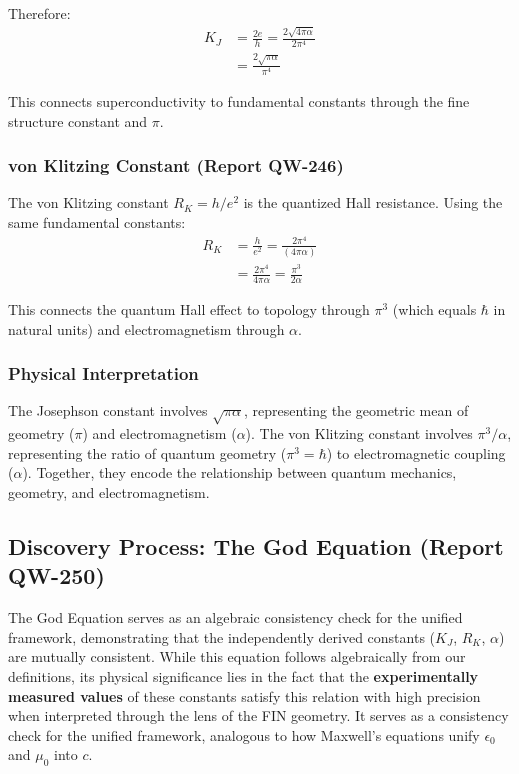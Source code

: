 \documentclass[11pt, a4paper]{article}
\begin{document}
Therefore:
\begin{align}
K_J &= \frac{2e}{h} = \frac{2\sqrt{4\pi\alpha}}{2\pi^4}\\
&= \frac{2\sqrt{\pi\alpha}}{\pi^4}
\label{eq:josephson}
\end{align}

This connects superconductivity to fundamental constants through the fine structure constant and $\pi$.

\subsubsection{von Klitzing Constant (Report QW-246)}

The von Klitzing constant $R_K = h/e^2$ is the quantized Hall resistance. Using the same fundamental constants:
\begin{align}
R_K &= \frac{h}{e^2} = \frac{2\pi^4}{(4\pi\alpha)}\\
&= \frac{2\pi^4}{4\pi\alpha} = \frac{\pi^3}{2\alpha}
\label{eq:klitzing}
\end{align}

This connects the quantum Hall effect to topology through $\pi^3$ (which equals $\hbar$ in natural units) and electromagnetism through $\alpha$.

\subsubsection{Physical Interpretation}

The Josephson constant involves $\sqrt{\pi\alpha}$, representing the geometric mean of geometry ($\pi$) and electromagnetism ($\alpha$). The von Klitzing constant involves $\pi^3/\alpha$, representing the ratio of quantum geometry ($\pi^3 = \hbar$) to electromagnetic coupling ($\alpha$). Together, they encode the relationship between quantum mechanics, geometry, and electromagnetism.

\subsection{Discovery Process: The God Equation (Report QW-250)}

The God Equation serves as an algebraic consistency check for the unified framework, demonstrating that the independently derived constants ($K_J$, $R_K$, $\alpha$) are mutually consistent. While this equation follows algebraically from our definitions, its physical significance lies in the fact that the \textbf{experimentally measured values} of these constants satisfy this relation with high precision when interpreted through the lens of the FIN geometry. It serves as a consistency check for the unified framework, analogous to how Maxwell's equations unify $\epsilon_0$ and $\mu_0$ into $c$.
\end{document}
